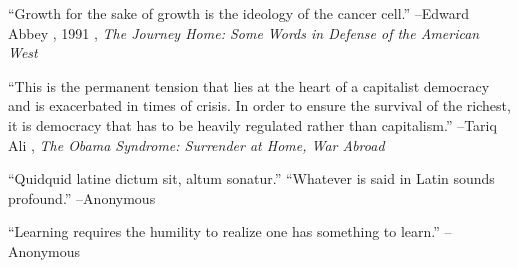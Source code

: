 \documentclass{article}%
\begin{document}
\linebreak%
\vspace{1mm}%
\begin{minipage}{\textwidth}%
\flushleft%
“Growth for the sake of growth is the ideology of the cancer cell.”%
\linebreak%
\vspace{1mm}%
–Edward Abbey%
, 1991%
, \textit{The Journey Home: Some Words in Defense of the American West}%
\linebreak%
\vspace{1mm}%
\end{minipage}%
\linebreak%
\vspace{1mm}%
\begin{minipage}{\textwidth}%
\flushleft%
“This is the permanent tension that lies at the heart of a capitalist democracy and is exacerbated in times of crisis. In order to ensure the survival of the richest, it is democracy that has to be heavily regulated rather than capitalism.”%
\linebreak%
\vspace{1mm}%
–Tariq Ali%
, \textit{The Obama Syndrome: Surrender at Home, War Abroad}%
\linebreak%
\vspace{1mm}%
\end{minipage}%
\linebreak%
\vspace{1mm}%
\begin{minipage}{\textwidth}%
\flushleft%
“Quidquid latine dictum sit, altum sonatur.”%
\linebreak%
\vspace{1mm}%
“Whatever is said in Latin sounds profound.”%
\linebreak%
–Anonymous%
\linebreak%
\vspace{1mm}%
\end{minipage}%
\linebreak%
\vspace{1mm}%
\begin{minipage}{\textwidth}%
\flushleft%
“Learning requires the humility to realize one has something to learn.”%
\linebreak%
\vspace{1mm}%
–Anonymous%
\linebreak%
\vspace{1mm}%
\end{minipage}%
\linebreak%
\vspace{1mm}%
\end{document}
